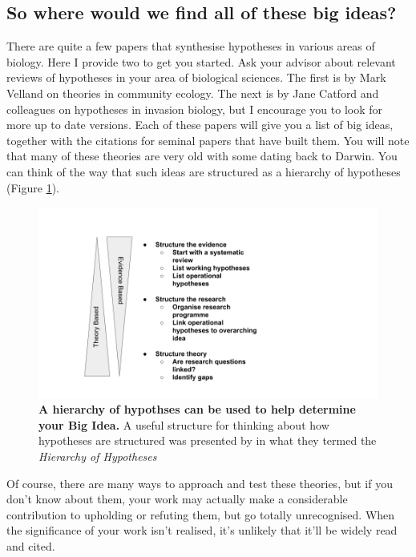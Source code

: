\documentclass[
]{krantz}
\begin{document}
\hypertarget{so-where-would-we-find-all-of-these-big-ideas}{%
\subsection{So where would we find all of these big ideas?}\label{so-where-would-we-find-all-of-these-big-ideas}}

There are quite a few papers that synthesise hypotheses in various areas of biology. Here I provide two to get you started. Ask your advisor about relevant reviews of hypotheses in your area of biological sciences. The first is by Mark Velland \citeyearpar{vellend2010conceptual} on theories in community ecology. The next is by Jane Catford and colleagues \citeyearpar{catford2009reducing} on hypotheses in invasion biology, but I encourage you to look for more up to date versions. Each of these papers will give you a list of big ideas, together with the citations for seminal papers that have built them. You will note that many of these theories are very old with some dating back to Darwin. You can think of the way that such ideas are structured as a hierarchy of hypotheses (Figure \ref{fig:JeschkeHagar61}).



\begin{figure}

\includegraphics[width=0.9\linewidth]{figures/JeschkeHagar61} \hfill{}

\caption{\textbf{A hierarchy of hypothses can be used to help determine your Big Idea.} A useful structure for thinking about how hypotheses are structured was presented by \citet{heger2018hierarchy} in what they termed the \emph{Hierarchy of Hypotheses}}\label{fig:JeschkeHagar61}
\end{figure}

Of course, there are many ways to approach and test these theories, but if you don't know about them, your work may actually make a considerable contribution to upholding or refuting them, but go totally unrecognised. When the significance of your work isn't realised, it's unlikely that it'll be widely read and cited.
\end{document}
